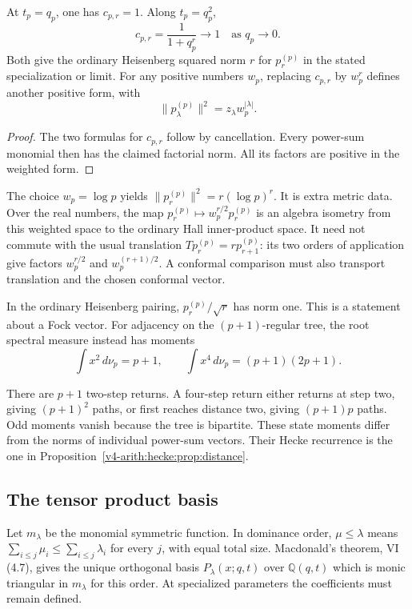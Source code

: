 \begin{proposition}\label{v4-arith:thm:free-fermion-match}
At $t_p=q_p$, one has $c_{p,r}=1$. Along $t_p=q_p^2$,
\[
 c_{p,r}=\frac1{1+q_p^r}\longrightarrow1
 \quad\text{as }q_p\longrightarrow0.
\]
Both give the ordinary Heisenberg squared norm $r$ for $p_r^{(p)}$
in the stated specialization or limit. For any positive numbers $w_p$, replacing
$c_{p,r}$ by $w_p^r$ defines another positive form, with
\[
 \|p_\lambda^{(p)}\|^2=z_\lambda w_p^{|\lambda|}.
\]
\end{proposition}
\begin{proof}
The two formulas for $c_{p,r}$ follow by cancellation. Every
power-sum monomial then has the claimed factorial norm.
All its factors are positive in the weighted form.
\end{proof}

The choice $w_p=\log p$ yields
$\|p_r^{(p)}\|^2=r(\log p)^r$.
It is extra metric data. Over the real numbers, the map
$p_r^{(p)}\mapsto w_p^{r/2}p_r^{(p)}$ is an algebra isometry from
this weighted space to the ordinary Hall inner-product space.
It need not commute with the usual translation
$T p_r^{(p)}=r p_{r+1}^{(p)}$: its two orders of application give
factors $w_p^{r/2}$ and $w_p^{(r+1)/2}$.
A conformal comparison must also transport translation and the
chosen conformal vector.

\begin{example}\label{v4-arith:comp:norm-vs-kesten-mckay}
In the ordinary Heisenberg pairing, $p_r^{(p)}/\sqrt r$ has norm
one. This is a statement about a Fock vector. For adjacency on the
$(p+1)$-regular tree, the root spectral measure instead has moments
\[
 \int x^2\,d\nu_p=p+1,\qquad
 \int x^4\,d\nu_p=(p+1)(2p+1).
\]

There are $p+1$ two-step returns. A four-step return either returns
at step two, giving $(p+1)^2$ paths, or first reaches distance two,
giving $(p+1)p$ paths. Odd moments vanish because the tree is
bipartite. These state moments differ from the norms of individual
power-sum vectors. Their Hecke recurrence is the one in
Proposition~\ref{v4-arith:hecke:prop:distance}.
\end{example}

\subsection{The tensor product basis}
\label{v4-arith:et:arithmetic-macdonald}

Let $m_\lambda$ be the monomial symmetric function. In dominance
order, $\mu\leq\lambda$ means
$\sum_{i\leq j}\mu_i\leq\sum_{i\leq j}\lambda_i$ for every $j$,
with equal total size. Macdonald's theorem, VI (4.7), gives the
unique orthogonal basis $P_\lambda(x;q,t)$ over $\mathbb Q(q,t)$
which is monic triangular in $m_\lambda$ for this order.
At specialized parameters the coefficients must remain defined.

